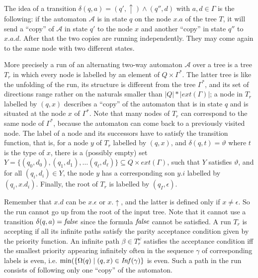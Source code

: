 \documentclass[a4paper,UKenglish,cleveref, autoref, thm-restate]{lipics-v2021}
\begin{document}
The idea of a transition $ \delta (q, a) = ( q',\uparrow ) \wedge (q'',d)$ with $a,d\in\Gamma$ is the following: 
if the automaton
$\mathcal{A}$ is in state $q$ on the node $x.a$ of the 
tree $T$, it will send a “copy” of $\mathcal{A}$  in state $q'$ to the node $x$ and
another “copy” in state $q''$ to $x.a.d$. 
After that the two copies are
running independently. They may come again to the same node with two different
states.


More precisely a run of an alternating two-way automaton $\mathcal{A}$ over a tree
is
a tree $T_r$ in which every node is labelled by an
element of $Q \times \Gamma^*$. The latter tree is like the unfolding of the run, its structure
is different from the tree $\Gamma^*$, and its set of directions range rather on the naturals smaller than $|Q|*|ext(\Gamma)|$; a node in $T_r$ labelled by $(q,x)$ describes a “copy”
of the automaton that is in state $q$ and is situated at the node $x$ of $\Gamma^*$. 
Note
that many nodes of $T_r$ can correspond to the same node of $\Gamma^*$, because the
automaton can come back to a previously visited node. 
The label of a node
and its successors have to satisfy the transition function,
that is, for a node $y$ of $T_r$ labelled by $(q,x)$, and $\delta(q,t)= \vartheta$ where $t$ is the type of $x$, there is a (possibly empty) set 
 $Y = \{ (q_0,d_0),(q_1,d_1), \ldots (q_\ell, d_\ell) \}  \subseteq  Q \times ext(\Gamma)$, such that $Y$ satisfies  $\vartheta $, and for all
$(q_i,d_i)  \in  Y$, the node $y$ has a corresponding son $y.i$ labelled by $(q_i,x.d_i)$. Finally, the root of $T_r$ is labelled by $(q_I,\epsilon)$.



Remember that $x.d$ can be $x. \epsilon$  or $x. \! \uparrow$, and the latter is defined only if 
$x  \neq   \epsilon $.
So the run cannot go up from the root of the input tree. Note that it cannot use a
transition  $\delta (q, a) = \text{\textit{false}}$ since the formula $\text{\textit{false}}$ cannot be satisfied.
A run $T_r$ is accepting if all its infinite paths satisfy the parity acceptance 
condition
given by the priority function. 
An infinite path $ \beta   \in  T_r^{\omega}$  satisfies the acceptance condition iff the smallest priority appearing infinitely often in
the sequence $\gamma$ of corresponding labels
 is even, i.e.
 $\min(\{ \Omega(q) \mid (q,x) \in \text{\textit{Inf}}(\gamma) \} $ is even. 
Such
a path in the run consists of following only one “copy” of the automaton. 
\end{document}
